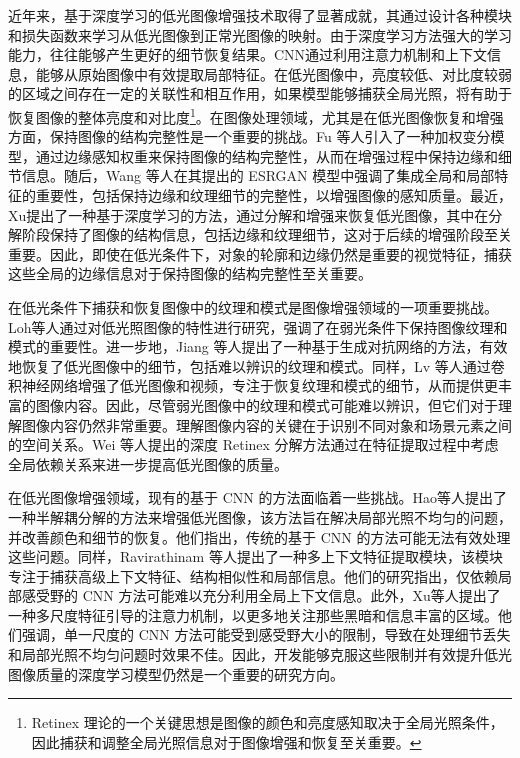 \documentclass[a4paper]{ctexart}
\begin{document}
		近年来，基于深度学习的低光图像增强技术取得了显著成就，其通过设计各种模块和损失函数来学习从低光图像到正常光图像的映射。由于深度学习方法强大的学习能力，往往能够产生更好的细节恢复结果。CNN通过利用注意力机制\cite{yang2021locally,zhang2020attention}和上下文信息，能够从原始图像中有效提取局部特征\cite{jain1991unsupervised, lowe2004distinctive, ojala2002multiresolution}。在低光图像中，亮度较低、对比度较弱的区域之间存在一定的关联性和相互作用，如果模型能够捕获全局光照，将有助于恢复图像的整体亮度和对比度\cite{chen2018learning, wang2013naturalness}\footnote{Retinex 理论的一个关键思想是图像的颜色和亮度感知取决于全局光照条件，因此捕获和调整全局光照信息对于图像增强和恢复至关重要。}。在图像处理领域，尤其是在低光图像恢复和增强方面，保持图像的结构完整性是一个重要的挑战。Fu 等人\cite{fu2016weighted}引入了一种加权变分模型，通过边缘感知权重来保持图像的结构完整性，从而在增强过程中保持边缘和细节信息。随后，Wang 等人\cite{wang2018esrgan}在其提出的 ESRGAN 模型中强调了集成全局和局部特征的重要性，包括保持边缘和纹理细节的完整性，以增强图像的感知质量。最近，Xu\cite{xu2020learning}提出了一种基于深度学习的方法，通过分解和增强来恢复低光图像，其中在分解阶段保持了图像的结构信息，包括边缘和纹理细节，这对于后续的增强阶段至关重要。因此，即使在低光条件下，对象的轮廓和边缘仍然是重要的视觉特征，捕获这些全局的边缘信息对于保持图像的结构完整性至关重要。
		
		在低光条件下捕获和恢复图像中的纹理和模式是图像增强领域的一项重要挑战。Loh等人\cite{loh2019getting}通过对低光照图像的特性进行研究，强调了在弱光条件下保持图像纹理和模式的重要性。进一步地，Jiang 等人\cite{jiang2021enlightengan}提出了一种基于生成对抗网络的方法，有效地恢复了低光图像中的细节，包括难以辨识的纹理和模式。同样，Lv 等人\cite{lv2018mbllen}通过卷积神经网络增强了低光图像和视频，专注于恢复纹理和模式的细节，从而提供更丰富的图像内容。因此，尽管弱光图像中的纹理和模式可能难以辨识，但它们对于理解图像内容仍然非常重要。理解图像内容的关键在于识别不同对象和场景元素之间的空间关系。Wei 等人\cite{wei2018deep}提出的深度 Retinex 分解方法通过在特征提取过程中考虑全局依赖关系来进一步提高低光图像的质量。
		
		在低光图像增强领域，现有的基于 CNN 的方法面临着一些挑战。Hao等人\cite{hao2020low}提出了一种半解耦分解的方法来增强低光图像，该方法旨在解决局部光照不均匀的问题，并改善颜色和细节的恢复。他们指出，传统的基于 CNN 的方法可能无法有效处理这些问题。同样，Ravirathinam 等人\cite{ravirathinam2021c}提出了一种多上下文特征提取模块，该模块专注于捕获高级上下文特征、结构相似性和局部信息。他们的研究指出，仅依赖局部感受野的 CNN 方法可能难以充分利用全局上下文信息。此外，Xu等人\cite{xu2021novel}提出了一种多尺度特征引导的注意力机制，以更多地关注那些黑暗和信息丰富的区域。他们强调，单一尺度的 CNN 方法可能受到感受野大小的限制，导致在处理细节丢失和局部光照不均匀问题时效果不佳。因此，开发能够克服这些限制并有效提升低光图像质量的深度学习模型仍然是一个重要的研究方向。
		
\end{document}
